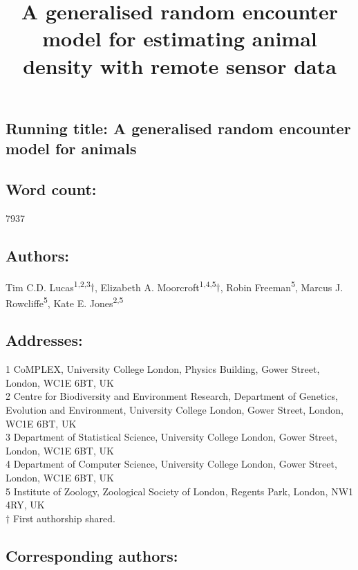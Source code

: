 \documentclass[a4paper,10pt,reqno,oneside]{amsart}
\begin{document}
\title[Lucas \emph{et al.}: A generalised random encounter model for animals]{A generalised random encounter model for estimating animal density with remote sensor data}
\maketitle

\subsection*{ Running title: A generalised random encounter model for animals}

\subsection*{ Word count:} 7937

\subsection*{ Authors:\\}
Tim C.D. Lucas\textsuperscript{1,2,3}$\dagger$, Elizabeth A. Moorcroft\textsuperscript{1,4,5}$\dagger$, Robin Freeman\textsuperscript{5}, Marcus J. Rowcliffe\textsuperscript{5}, Kate E. Jones\textsuperscript{2,5}


\subsection*{ Addresses:\\}
1 CoMPLEX, University College London, Physics Building, Gower Street, London, WC1E 6BT, UK\\ 
2 Centre for Biodiversity and Environment Research, Department of Genetics, Evolution and Environment, University College London, Gower Street, London, WC1E 6BT, UK\\ 
3 Department of Statistical Science, University College London, Gower Street, London, WC1E 6BT, UK\\ 
4 Department of Computer Science, University College London, Gower Street, London, WC1E 6BT, UK\\ 
5 Institute of Zoology, Zoological Society of London, Regents Park, London, NW1 4RY, UK\\
$\dagger$ First authorship shared. 

\subsection*{ Corresponding authors:\\}
\end{document}
